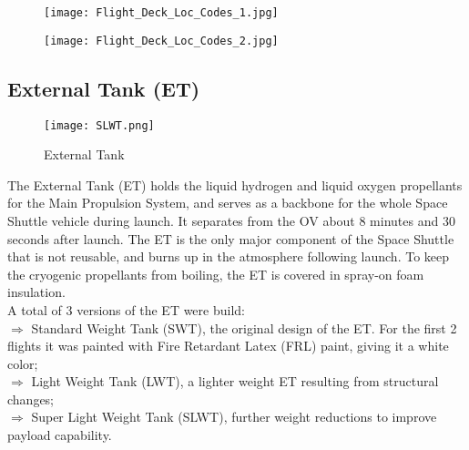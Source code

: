 \documentclass[Space_Shuttle_Vessel_Manual.tex]{subfiles}
\begin{document}
\newpage
\begin{figure}[H]
  \centering
  \texttt{[image: Flight\_Deck\_Loc\_Codes\_1.jpg]}
  \caption{}
  \label{fig:FlightDeckLocCodes1}
\end{figure}
\begin{figure}[H]
  \centering
  \texttt{[image: Flight\_Deck\_Loc\_Codes\_2.jpg]}
  \caption{}
  \label{fig:FlightDeckLocCodes2}
\end{figure}






\subsection{External Tank (ET)}
\begin{figure}[b!]
  \texttt{[image: SLWT.png]}
  \caption{External Tank}
  \label{fig:ET}
\end{figure}
\begin{multicols*}{2}
The External Tank (ET) holds the liquid hydrogen and liquid oxygen propellants for the Main Propulsion System, and serves as a backbone for the whole Space Shuttle vehicle during launch. It separates from the OV about 8 minutes and 30 seconds after launch. The ET is the only major component of the Space Shuttle that is not reusable, and burns up in the atmosphere following launch. To keep the cryogenic propellants from boiling, the ET is covered in spray-on foam insulation.\\
A total of 3 versions of the ET were build$\colon$\\
$\Rightarrow$ Standard Weight Tank (SWT), the original design of the ET. For the first 2 flights it was painted with Fire Retardant Latex (FRL) paint, giving it a white color;\\
$\Rightarrow$ Light Weight Tank (LWT), a lighter weight ET resulting from structural changes;\\
$\Rightarrow$ Super Light Weight Tank (SLWT), further weight reductions to improve payload capability.\\
\end{multicols*}
\end{document}
